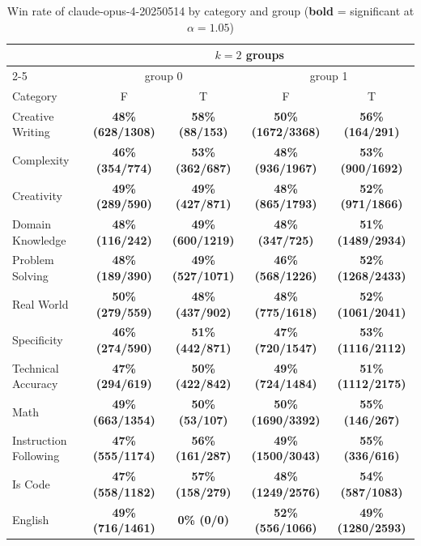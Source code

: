 \begin{table}[ht]
\centering
\scriptsize
\setlength{\tabcolsep}{3pt}
\renewcommand{\arraystretch}{1.2}
\caption{Win rate of claude-opus-4-20250514 by category and group (\textbf{bold} = significant at $\alpha=1.05$)}
\label{tab:winrate_2}
\begin{tabular}{lcccc}
\toprule
 & \multicolumn{4}{c}{$k=2$ groups} \\
\cmidrule(lr){2-5}
 & \multicolumn{2}{c}{group 0} & \multicolumn{2}{c}{group 1} \\
Category & F & T & F & T \\
\midrule
Creative Writing & \textbf{48\% (628/1308)} & \textbf{58\% (88/153)} & \textbf{50\% (1672/3368)} & \textbf{56\% (164/291)} \\
Complexity & \textbf{46\% (354/774)} & \textbf{53\% (362/687)} & \textbf{48\% (936/1967)} & \textbf{53\% (900/1692)} \\
Creativity & \textbf{49\% (289/590)} & \textbf{49\% (427/871)} & \textbf{48\% (865/1793)} & \textbf{52\% (971/1866)} \\
Domain Knowledge & \textbf{48\% (116/242)} & \textbf{49\% (600/1219)} & \textbf{48\% (347/725)} & \textbf{51\% (1489/2934)} \\
Problem Solving & \textbf{48\% (189/390)} & \textbf{49\% (527/1071)} & \textbf{46\% (568/1226)} & \textbf{52\% (1268/2433)} \\
Real World & \textbf{50\% (279/559)} & \textbf{48\% (437/902)} & \textbf{48\% (775/1618)} & \textbf{52\% (1061/2041)} \\
Specificity & \textbf{46\% (274/590)} & \textbf{51\% (442/871)} & \textbf{47\% (720/1547)} & \textbf{53\% (1116/2112)} \\
Technical Accuracy & \textbf{47\% (294/619)} & \textbf{50\% (422/842)} & \textbf{49\% (724/1484)} & \textbf{51\% (1112/2175)} \\
Math & \textbf{49\% (663/1354)} & \textbf{50\% (53/107)} & \textbf{50\% (1690/3392)} & \textbf{55\% (146/267)} \\
Instruction Following & \textbf{47\% (555/1174)} & \textbf{56\% (161/287)} & \textbf{49\% (1500/3043)} & \textbf{55\% (336/616)} \\
Is Code & \textbf{47\% (558/1182)} & \textbf{57\% (158/279)} & \textbf{48\% (1249/2576)} & \textbf{54\% (587/1083)} \\
English & \textbf{49\% (716/1461)} & \textbf{0\% (0/0)} & \textbf{52\% (556/1066)} & \textbf{49\% (1280/2593)} \\
\bottomrule
\end{tabular}
\end{table}